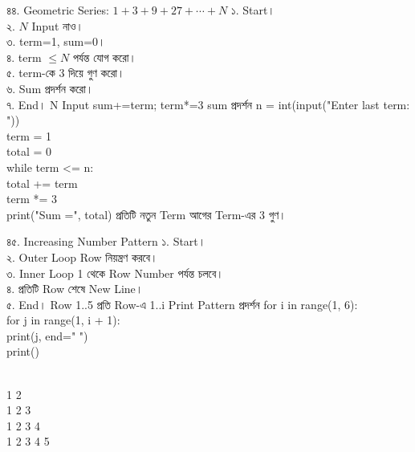
\exerciseTable
{৪৪. Geometric Series: \(1+3+9+27+\cdots+N\)}
{
১. Start।\\
২. \(N\) Input নাও।\\
৩. term=1, sum=0।\\
৪. term \(\le N\) পর্যন্ত যোগ করো।\\
৫. term-কে 3 দিয়ে গুণ করো।\\
৬. Sum প্রদর্শন করো।\\
৭. End।
}
{
\linearflow
{N Input}
{sum+=term; term*=3}
{sum প্রদর্শন}
}
{
n = int(input("Enter last term: "))\\
term = 1\\
total = 0\\
while term <= n:\\
\hspace*{4mm}total += term\\
\hspace*{4mm}term *= 3\\
print("Sum =", total)
}
{
প্রতিটি নতুন Term আগের Term-এর 3 গুণ।
}


\exerciseTable
{৪৫. Increasing Number Pattern}
{
১. Start।\\
২. Outer Loop Row নিয়ন্ত্রণ করবে।\\
৩. Inner Loop 1 থেকে Row Number পর্যন্ত চলবে।\\
৪. প্রতিটি Row শেষে New Line।\\
৫. End।
}
{
\linearflow
{Row 1..5}
{প্রতি Row-এ 1..i Print}
{Pattern প্রদর্শন}
}
{
for i in range(1, 6):\\
\hspace*{4mm}for j in range(1, i + 1):\\
\hspace*{8mm}print(j, end=" ")\\
\hspace*{4mm}print()
}
{
\begin{english}
\\
1 2\\
1 2 3\\
1 2 3 4\\
1 2 3 4 5
\end{english}
}


